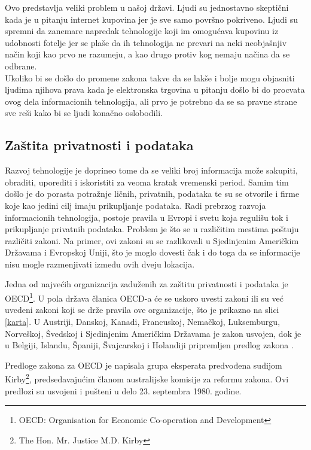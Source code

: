 \documentclass[a4paper]{article}
\begin{document}
{Ovo predstavlja veliki problem u našoj državi. Ljudi su jednostavno skeptični kada je u pitanju internet kupovina jer je sve samo površno pokriveno. Ljudi su spremni da zanemare napredak tehnologije koji im omogućava kupovinu iz udobnosti fotelje jer se plaše da ih tehnologija ne prevari na neki neobjašnjiv način koji kao prvo ne razumeju, a kao drugo protiv kog nemaju načina da se odbrane. \\ Ukoliko bi se došlo do promene zakona takve da se lakše i bolje mogu objasniti ljudima njihova prava kada je elektronska trgovina u pitanju došlo bi do procvata ovog dela informacionih tehnologija, ali prvo je potrebno da se sa pravne strane sve reši kako bi se ljudi konačno oslobodili.

\subsection{Zaštita privatnosti i podataka}

Razvoj tehnologije je doprineo tome da se veliki broj informacija može sakupiti, obraditi, uporediti i iskoristiti za veoma kratak vremenski period. Samim tim došlo je do porasta potražnje ličnih, privatnih, podataka te su se otvorile i firme koje kao jedini cilj imaju prikupljanje podataka. Radi prebrzog razvoja informacionih tehnologija, postoje pravila u Evropi i svetu koja regulišu tok i prikupljanje privatnih podataka. Problem je što se u različitim mestima poštuju različiti zakoni. Na primer, ovi zakoni su se razlikovali u Sjedinjenim Američkim Državama i Evropskoj Uniji, što je moglo dovesti čak i do toga da se informacije nisu mogle razmenjivati između ovih dveju lokacija.

Jedna od najvećih organizacija zaduženih za zaštitu privatnosti i podataka je OECD\footnote{OECD: Organisation for Economic Co-operation and Development}. U pola država članica OECD-a će se uskoro uvesti zakoni ili su već uvedeni zakoni koji se drže pravila ove organizacije, što je prikazno na slici \ref{karta}. U Austriji, Danskoj, Kanadi, Francuskoj, Nemačkoj, Luksemburgu, Norveškoj, Švedskoj i Sjedinjenim Američkim Državama je zakon usvojen, dok je u Belgiji, Islandu, Španiji, Švajcarskoj i Holandiji pripremljen predlog zakona \cite{OECD}.

Predloge zakona za OECD je napisala grupa eksperata predvođena sudijom Kirby\footnote{The Hon. Mr. Justice M.D. Kirby}, predsedavajućim članom australijske komisije za reformu zakona. Ovi predlozi su usvojeni i pušteni u delo 23. septembra 1980. godine.

}
\end{document}
